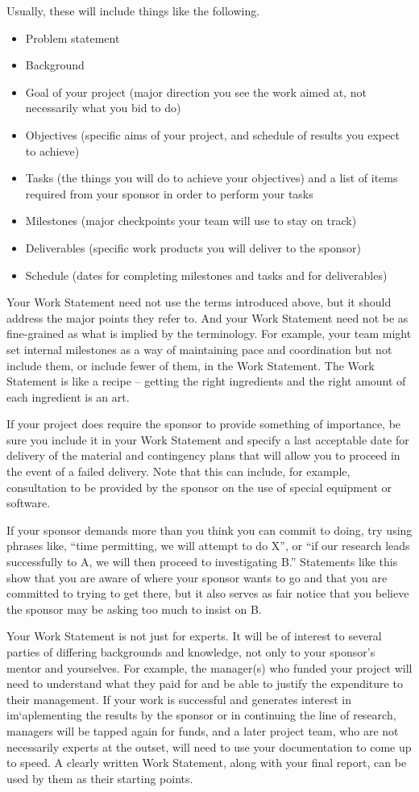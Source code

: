 \documentclass[12pt]{article}
\begin{document}
Usually, these will include things like the following. 
\begin{itemize}
\item Problem statement
\item Background
\item Goal of your project (major direction you see the work aimed at,
  not necessarily what you bid to do)
\item Objectives (specific aims of your project, and schedule of
  results you expect to achieve)
\item Tasks (the things you will do to achieve your objectives) and a list of items
required from your sponsor in order to perform your tasks
\item Milestones (major checkpoints your team will use to stay on track)
\item Deliverables (specific work products you will deliver to the sponsor)
\item Schedule (dates for completing milestones and tasks and for deliverables)
\end{itemize}
Your Work Statement need not use the terms introduced above, but it
should address the major points they refer to.  And your Work Statement
need not be as fine-grained as what is implied by the terminology. 
For example, your team might set internal milestones as a
way of maintaining pace and coordination but not include them, or
include fewer of them, in the Work Statement. The Work Statement is
like a recipe -- getting the right ingredients and the right amount of
each ingredient is an art.

If your project does require the sponsor to provide something of
importance, be sure you include it in your Work Statement and specify
a last acceptable date for delivery of the material and contingency
plans that will allow you to proceed in the event of a failed
delivery. Note that this can include, for example, consultation to be
provided by the sponsor on the use of special equipment or software.

If your sponsor demands more than you think you can commit to doing,
try using phrases like, ``time permitting, we will attempt to do X'', or
``if our research leads successfully to A, we will then proceed to
investigating B.'' Statements like this show that you are aware of
where your sponsor wants to go and that you are committed to trying to
get there, but it also serves as fair notice that you believe the
sponsor may be asking too much to insist on B.

Your Work Statement is not just for experts. It will be of interest to
several parties of differing backgrounds and knowledge, not only to
your sponsor’s mentor and yourselves. For example, the manager(s) who
funded your project will need to understand what they paid for and be
able to justify the expenditure to their management. If your work is
successful and generates interest in im`aplementing the results by the
sponsor or in continuing the line of research, managers will be tapped
again for funds, and a later project team, who are not necessarily
experts at the outset, will need to use your documentation to come up
to speed. A clearly written Work Statement, along with your final
report, can be used by them as their starting points.


\nocite{*}

\end{document}
